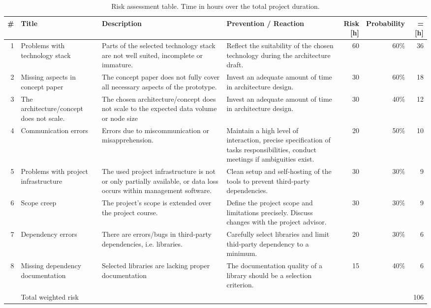 \begin{table}
	\centering
	\caption[Risk assessment]{Risk assessment table. Time in hours over the total project duration.}
	\label{tbl:project-risks}
	\begin{tabu}{r l X X r r r}
		\hline
		\# & Title & Description & Prevention / Reaction & Risk [h] & Probability & = [h] \\ \hline

		1 & Problems with technology stack
		  & Parts of the selected technology stack are not well suited, incomplete or immature.
		  & Reflect the suitability of the chosen technology during the architecture draft.
		  & 60 & 60\% & 36\\

		2 & Missing aspects in concept paper
		  & The concept paper does not fully cover all necessary aspects of the prototype.
		  & Invest an adequate amount of time in architecture design.
		  & 30 & 60\% & 18\\

		3 & The architecture/concept does not scale.
		  & The chosen architecture/concept does not scale to the expected data volume or node size
		  & Invest an adequate amount of time in architecture design.
		  & 30 & 40\% & 12\\

		4 & Communication errors
		  & Errors due to miscommunication or misapprehension.
		  & Maintain a high level of interaction, precise specification of tasks responsibilities, conduct meetings if ambiguities exist.
		  & 20 & 50\% & 10\\

		5 & Problems with project infrastructure
		  & The used project infrastructure is not or only partially available, or data loss occurs within management software.
		  & Clean setup and self-hosting of the tools to prevent third-party dependencies.
		  & 30 & 30\% & 9 \\

		6 & Scope creep
		  & The project's scope is extended over the project course.
		  & Define the project scope and limitations precisely. Discuss changes with the project advisor.
		  & 30 & 30\% & 9\\

		7 & Dependency errors
		  & There are errors/bugs in third-party dependencies, i.e. libraries.
		  & Carefully select libraries and limit thid-party dependency to a minimum.
		  & 20 & 30\% & 6\\

		8 & Missing dependency documentation
		  & Selected libraries are lacking proper documentation
		  & The documentation quality of a library should be a selection criterion.
		  & 15 & 40\% & 6\\

		 \hline
		& Total weighted risk & & & & & 106\\
		\hline
	\end{tabu}
\end{table}


